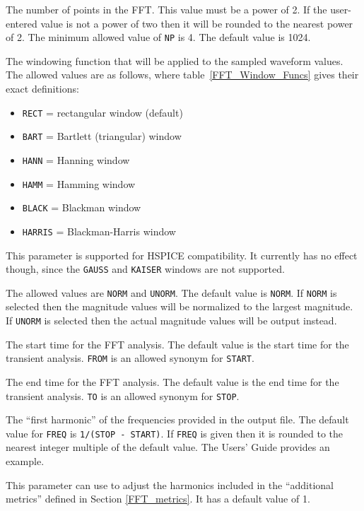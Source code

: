 \begin{Command}
\begin {Arguments}
The number of points in the FFT.  This value must be a power of 2.  If
the user-entered value is not a power of two then it will be rounded to
the nearest power of 2.  The minimum allowed value of {\tt NP} is 4.
The default value is 1024.

The windowing function that will be applied to the sampled waveform
values.  The allowed values are as follows, where table~\ref{FFT_Window_Funcs}
gives their exact definitions:

\begin{itemize}
  \item \texttt{RECT} = rectangular window (default)
  \item \texttt{BART} = Bartlett (triangular) window
  \item \texttt{HANN} = Hanning window
  \item \texttt{HAMM} = Hamming window
  \item \texttt{BLACK} = Blackman window
  \item \texttt{HARRIS} = Blackman-Harris window
\end{itemize}

This parameter is supported for HSPICE compatibility. It currently
has no effect though, since the {\tt GAUSS} and {\tt KAISER} windows
are not supported.

The allowed values are {\tt NORM} and {\tt UNORM}.  The default
value is {\tt NORM}. If {\tt NORM} is selected then the magnitude
values will be normalized to the largest magnitude.  If {\tt UNORM}
is selected then the actual magnitude values will be output instead.

The start time for the FFT analysis.  The default value is the
start time for the transient analysis. {\tt FROM} is an allowed
synonym for {\tt START}.

The end time for the FFT analysis.  The default value is the
end time for the transient analysis. {\tt TO} is an allowed
synonym for {\tt STOP}.

The ``first harmonic'' of the frequencies provided in the output
file.  The default value for {\tt FREQ} is {\tt 1/(STOP - START)}.
If {\tt FREQ} is given then it is rounded to the nearest integer
multiple of the default value.  The \Xyce{} Users' Guide\UsersGuide
provides an example.

This parameter can use to adjust the harmonics included in the
``additional metrics'' defined in Section \ref{FFT_metrics}.  It
has a default value of 1.


\end{Arguments}
\end{Command}
